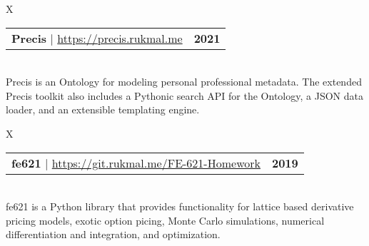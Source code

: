 \documentclass[10pt]{article}
\newcommand{\tabularxwidth}{\textwidth}
\begin{document}
        \begin{tabularx}{\tabularxwidth}{X}
                {
                    \begin{tabularx}{\tabularxwidth}{@{}X r}
                        \textbf{Precis}
                            | \url{https://precis.rukmal.me}
                        &
                        \textbf{
        2021} \\
                    \end{tabularx}
                } \\

            

            
    Precis is an Ontology for modeling personal professional metadata. The extended Precis toolkit also includes a Pythonic search API for the Ontology, a JSON data loader, and an extensible templating engine. \\

        \end{tabularx}

        
            \vspace{.3em}
        

    

        \begin{tabularx}{\tabularxwidth}{X}
                {
                    \begin{tabularx}{\tabularxwidth}{@{}X r}
                        \textbf{fe621}
                            | \url{https://git.rukmal.me/FE-621-Homework}
                        &
                        \textbf{
        2019} \\
                    \end{tabularx}
                } \\

            

            
    fe621 is a Python library that provides functionality for lattice based derivative pricing models, exotic option picing, Monte Carlo simulations, numerical differentiation and integration, and optimization. \\

        \end{tabularx}
\end{document}
